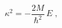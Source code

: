 \begin{equation}
 \kappa^2
= - 
\frac{2M}{\hbar^{2}} \,   
E
\;  ,
\label{eq:kappa}
\end{equation}

